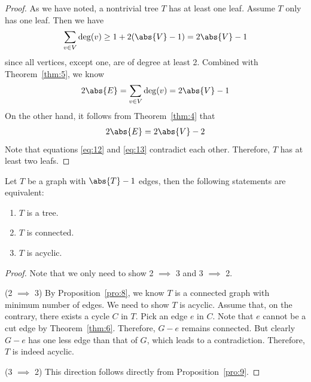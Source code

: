 \documentclass[thmcnt=section, 12pt, color=cyan]{my-elegantbook}
\begin{document}
\begin{proof}
	As we have noted, 
	a nontrivial tree $T$ has at least one leaf.
	Assume $T$ only has one leaf.
	Then we have 
	\begin{align*}
		\sum_{v \in V} \deg(v)
		\geq 1 + 2 (\abs{V} - 1)
		= 2 \abs{V} - 1
	\end{align*}
	since all vertices, except one, 
	are of degree at least 2.
	Combined with Theorem~\ref{thm:5}, we know 
	\begin{align}	
		2\abs{E} = \sum_{v \in V} \deg(v)
		= 2 \abs{V} - 1
		\label{eq:12}
	\end{align}
	On the other hand, it follows from Theorem~\ref{thm:4} that 
	\begin{align}
		2\abs{E} = 2 \abs{V} - 2
		\label{eq:13}
	\end{align}
	Note that equations \eqref{eq:12} and \eqref{eq:13}
	contradict each other. 
	Therefore, $T$ has at least two leafs.
\end{proof}


\begin{theorem} \label{thm:7}
	Let $T$ be a graph with $\abs{T}-1$ edges, 
	then the following statements are equivalent:
	\begin{enumerate}
		\item $T$ is a tree.
		\item $T$ is connected.
		\item $T$ is acyclic.
	\end{enumerate}
\end{theorem}

\begin{proof}
	Note that we only need to show 2 $\implies$ 3
	and 3 $\implies$ 2.

	(2 $\implies$ 3) By Proposition~\ref{pro:8}, we know
	$T$ is a connected graph with minimum number of edges.
	We need to show $T$ is acyclic.
	Assume that, on the contrary, there exists a cycle $C$ in $T$.
	Pick an edge $e$ in $C$.
	Note that $e$ cannot be a cut edge by Theorem~\ref{thm:6}.
	Therefore, $G-e$ remains connected.
	But clearly $G-e$ has one less edge than that of $G$, 
	which leads to a contradiction.
	Therefore, $T$ is indeed acyclic.

	(3 $\implies$ 2) This direction follows directly 
	from Proposition~\ref{pro:9}.
\end{proof}


\printbibliography[heading=bibintoc, title=References]


\printindex

\end{document}
